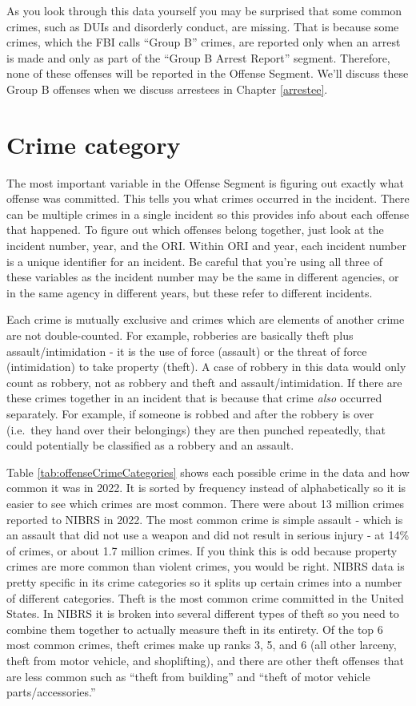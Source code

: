 \documentclass[
]{krantz}
\begin{document}
As you look through this data yourself you may be surprised
that some common crimes, such as DUIs and disorderly
conduct, are missing. That is because some crimes, which the
FBI calls ``Group B'' crimes, are reported only when an
arrest is made and only as part of the ``Group B Arrest
Report'' segment. Therefore, none of these offenses will be
reported in the Offense Segment. We'll discuss these Group B
offenses when we discuss arrestees in Chapter
\ref{arrestee}.

\section{Crime category}\label{crime-category}

The most important variable in the Offense Segment is
figuring out exactly what offense was committed. This tells
you what crimes occurred in the incident. There can be
multiple crimes in a single incident so this provides info
about each offense that happened. To figure out which
offenses belong together, just look at the incident number,
year, and the ORI. Within ORI and year, each incident number
is a unique identifier for an incident. Be careful that
you're using all three of these variables as the incident
number may be the same in different agencies, or in the same
agency in different years, but these refer to different
incidents.

Each crime is mutually exclusive and crimes which are
elements of another crime are not double-counted. For
example, robberies are basically theft plus
assault/intimidation - it is the use of force (assault) or
the threat of force (intimidation) to take property (theft).
A case of robbery in this data would only count as robbery,
not as robbery and theft and assault/intimidation. If there
are these crimes together in an incident that is because
that crime \emph{also} occurred separately. For example, if
someone is robbed and after the robbery is over (i.e.~they
hand over their belongings) they are then punched
repeatedly, that could potentially be classified as a
robbery and an assault.

Table \ref{tab:offenseCrimeCategories} shows each possible
crime in the data and how common it was in 2022. It is
sorted by frequency instead of alphabetically so it is
easier to see which crimes are most common. There were about
13 million crimes reported to NIBRS in 2022. The most common
crime is simple assault - which is an assault that did not
use a weapon and did not result in serious injury - at 14\%
of crimes, or about 1.7 million crimes. If you think this is
odd because property crimes are more common than violent
crimes, you would be right. NIBRS data is pretty specific in
its crime categories so it splits up certain crimes into a
number of different categories. Theft is the most common
crime committed in the United States. In NIBRS it is broken
into several different types of theft so you need to combine
them together to actually measure theft in its entirety. Of
the top 6 most common crimes, theft crimes make up ranks 3,
5, and 6 (all other larceny, theft from motor vehicle, and
shoplifting), and there are other theft offenses that are
less common such as ``theft from building'' and ``theft of
motor vehicle parts/accessories.''
\end{document}
